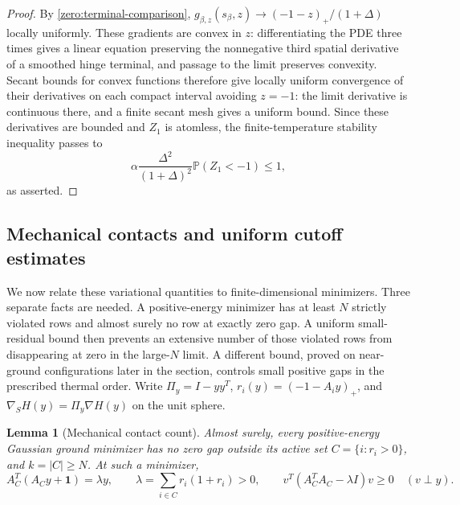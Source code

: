 \documentclass[11pt,a4paper]{article}
\numberwithin{equation}{section}
\newtheorem{lemma}[theorem]{Lemma}
\theoremstyle{definition}
\theoremstyle{remark}
\newcommand{\Prob}{\mathbb P}
\begin{document}
\begin{proof}
By \eqref{zero:terminal-comparison},
\(g_{\beta,z}(s_\beta,z)\to(-1-z)_+/(1+\Delta)\) locally uniformly.
These gradients are convex in \(z\): differentiating the PDE three
times gives a linear equation preserving the nonnegative third
spatial derivative of a smoothed hinge terminal, and passage to the
limit preserves convexity.  Secant bounds for convex functions
therefore give locally uniform convergence of their derivatives
on each compact interval avoiding \(z=-1\): the limit derivative
is continuous there, and a finite secant mesh gives a uniform bound.
Since these derivatives are bounded and \(Z_1\) is atomless, the
finite-temperature stability inequality passes to
\[
 \alpha\frac{\Delta^2}{(1+\Delta)^2}\Prob(Z_1<-1)\le1,
\]
as asserted.
\end{proof}

\subsection{Mechanical contacts and uniform cutoff estimates}

We now relate these variational quantities to finite-dimensional
minimizers.  Three separate facts are needed.  A positive-energy
minimizer has at least $N$ strictly violated rows and almost surely no
row at exactly zero gap.  A uniform small-residual bound then prevents
an extensive number of those violated rows from disappearing at zero
in the large-$N$ limit.  A different bound, proved on near-ground
configurations later in the section, controls small positive gaps in
the prescribed thermal order.  Write \(\Pi_y=I-yy^T\), \(r_i(y)=(-1-A_i y)_+\), and
\(\nabla_S H(y)=\Pi_y\nabla H(y)\) on the unit sphere.

\begin{lemma}[Mechanical contact count]\label{zero:mechanical}
Almost surely, every positive-energy Gaussian ground minimizer has
no zero gap outside its active set \(C=\{i:r_i>0\}\), and
\(k=|C|\ge N\).  At such a minimizer,
\begin{equation}\label{zero:mechanical-hessian}
 A_C^T(A_Cy+\mathbf1)=\lambda y,
 \qquad \lambda=\sum_{i\in C}r_i(1+r_i)>0,
 \qquad
 v^T(A_C^TA_C-\lambda I)v\ge0\quad(v\perp y).
\end{equation}
\end{lemma}
\end{document}
